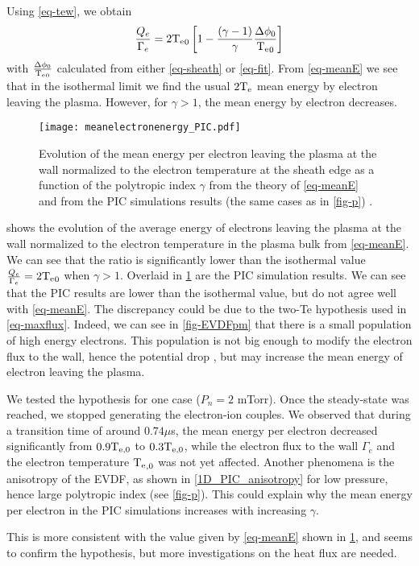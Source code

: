 Using \cref{eq-tew}, we obtain
\begin{equation}
  \label{eq-meanE}
  \frac{Q_e}{\Gamma_e} =  2 \mathrm{T_e}_0 \left[1 - \frac{(\gamma - 1)}{\gamma} \frac{\Delta \phi_0}{\mathrm{T_e}_0} \right]
\end{equation}
with $\frac{\Delta \phi_0}{\mathrm{T_e}_0}$ calculated from either \cref{eq-sheath} or \cref{eq-fit}.
From \cref{eq-meanE} we see that in the isothermal limit we find the usual $2 \mathrm{T_e}$ mean energy by electron leaving the plasma.
However, for $\gamma > 1$, the mean energy by electron decreases.


\begin{figure}[!htbp]
  \centering
  \texttt{[image: meanelectronenergy\_PIC.pdf]}
  \caption{Evolution of the mean energy per electron leaving the plasma at the wall normalized to the electron temperature at the sheath edge as a function of the polytropic index $\gamma$ from the theory of \cref{eq-meanE} and from the PIC simulations results (the same cases as in \cref{fig-p}) . }
  \label{fig-avE}
\end{figure}

 shows the evolution of the average energy of electrons leaving the plasma at the wall normalized to the electron temperature in the plasma bulk from \cref{eq-meanE}.
We can see that the ratio is significantly lower than the isothermal value $\frac{Q_e}{\Gamma_e} = 2 \mathrm{T_e}_0$ when $\gamma > 1$.
Overlaid in \cref{fig-avE} are the PIC simulation results.
We can see that the PIC results are lower than the isothermal value, but do not agree well with \cref{eq-meanE}.
The discrepancy could be due to the two-Te hypothesis used in \cref{eq-maxflux}.
Indeed, we can see in \cref{fig-EVDFpm} that there is a small population of high energy electrons.
This population is not big enough to modify the electron flux to the wall, hence the potential drop \citep{demidov2005}, but may increase the mean energy of electron leaving the plasma.
{  We tested the hypothesis for one case ($P_n=2$ mTorr).
Once the steady-state was reached, we stopped generating the electron-ion couples.
We observed that during a transition time of around $0.74 \mu$s, the mean energy per electron decreased significantly from $0.9 \mathrm{T_{e, 0}}$  to $0.3 \mathrm{T_{e, 0}}$, while the electron flux to the wall $\Gamma_e$ and the electron temperature $\mathrm{T_e}_{, 0}$ was not yet affected.
Another phenomena is the anisotropy of the \ac{EVDF}, as shown in \cref{1D_PIC_anisotropy} for low pressure, hence large polytropic index (see \cref{fig-p}). 
This could explain why the mean energy per electron in the \ac{PIC} simulations increases with increasing $\gamma$.

This is more consistent with the value given by \cref{eq-meanE} shown in \cref{fig-avE}, and seems to confirm the hypothesis, but more investigations on the heat flux are needed.
  }
